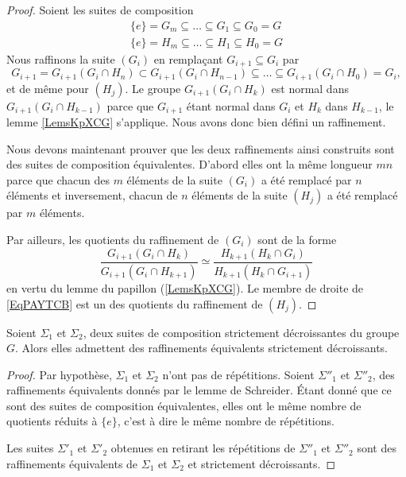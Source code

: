\begin{proof}
    Soient les suites de composition
    \begin{subequations}
        \begin{align}
            \{ e \}=G_m\subseteq\ldots\subseteq G_1\subseteq G_0=G\\
            \{ e \}=H_m\subseteq\ldots\subseteq H_1\subseteq H_0=G
        \end{align}
    \end{subequations}
    Nous raffinons la suite \( (G_i)\) en remplaçant \( G_{i+1}\subseteq G_i\) par
    \begin{equation}
        G_{i+1}=G_{i+1}(G_i\cap H_n)\subset G_{i+1}(G_i\cap H_{n-1})\subseteq\ldots\subseteq G_{i+1}(G_i\cap H_0)=G_i,
    \end{equation}
    et de même pour \( (H_j)\). Le groupe \( G_{i+1}(G_i\cap H_k)\) est normal dans \( G_{i+1}(G_i\cap H_{k-1})\) parce que \( G_{i+1}\) étant normal dans \( G_i\) et \( H_k\) dans \( H_{k-1}\), le lemme \ref{LemsKpXCG} s'applique. Nous avons donc bien défini un raffinement.

    Nous devons maintenant prouver que les deux raffinements ainsi construits sont des suites de composition équivalentes. D'abord elles ont la même longueur \( mn\) parce que chacun des \( m\) éléments de la suite \( (G_i)\) a été remplacé par \( n\) éléments et inversement, chacun de \( n\) éléments de la suite \( (H_j)\) a été remplacé par \( m\) éléments.

    Par ailleurs, les quotients du raffinement de \( (G_i)\) sont de la forme
    \begin{equation}    \label{EqPAYTCB}
        \frac{ G_{i+1}(G_i \cap H_k) }{ G_{i+1}(G_i\cap H_{k+1}) }\simeq \frac{ H_{k+1}(H_k\cap G_i) }{ H_{k+1}(H_k\cap G_{i+1}) }
    \end{equation}
    en vertu du lemme du papillon (\ref{LemsKpXCG}). Le membre de droite de \eqref{EqPAYTCB} est un des quotients du raffinement de \( (H_j)\).
\end{proof}

\begin{lemma}    \label{LemBSicRJ}
    Soient \( \Sigma_1\) et \( \Sigma_2\), deux suites de composition strictement décroissantes du groupe \( G\). Alors elles admettent des raffinements équivalents strictement décroissants.
\end{lemma}

\begin{proof}
    Par hypothèse, \( \Sigma_1\) et \( \Sigma_2\) n'ont pas de répétitions. Soient \( \Sigma''_1\) et \( \Sigma''_2\), des raffinements équivalents donnés par le lemme de Schreider. Étant donné que ce sont des suites de composition équivalentes, elles ont le même nombre de quotients réduits à \( \{ e \}\), c'est à dire le même nombre de répétitions.

    Les suites \( \Sigma'_1\) et \( \Sigma'_2\) obtenues en retirant les répétitions de \( \Sigma''_1\) et \( \Sigma''_2\) sont des raffinements équivalents de \( \Sigma_1\) et \( \Sigma_2\) et strictement décroissants.
\end{proof}

